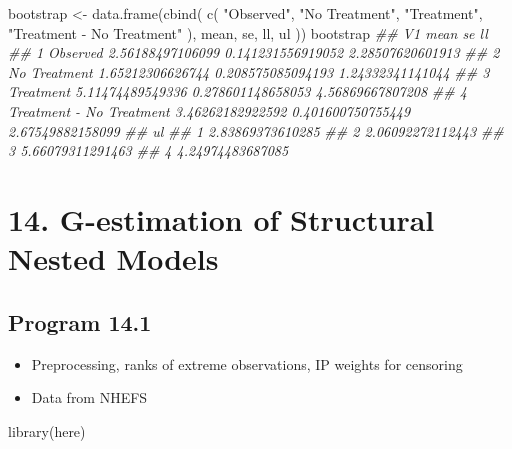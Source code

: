 \documentclass[
  10pt,
  a4paper,
]{book}
\newenvironment{Shaded}{\begin{snugshade}}{\end{snugshade}}
\newcommand{\DocumentationTok}[1]{\textcolor[rgb]{0.37,0.37,0.37}{\textit{#1}}}
\newcommand{\FunctionTok}[1]{\textcolor[rgb]{0.28,0.35,0.67}{#1}}
\newcommand{\NormalTok}[1]{\textcolor[rgb]{0.00,0.46,0.62}{#1}}
\newcommand{\OtherTok}[1]{\textcolor[rgb]{0.00,0.46,0.62}{#1}}
\newcommand{\StringTok}[1]{\textcolor[rgb]{0.13,0.47,0.30}{#1}}
\providecommand{\tightlist}{%
  \setlength{\itemsep}{0pt}\setlength{\parskip}{0pt}}
\begin{document}
\begin{Shaded}
\begin{Highlighting}[]
\NormalTok{bootstrap }\OtherTok{\textless{}{-}}
  \FunctionTok{data.frame}\NormalTok{(}\FunctionTok{cbind}\NormalTok{(}
    \FunctionTok{c}\NormalTok{(}
      \StringTok{"Observed"}\NormalTok{,}
      \StringTok{"No Treatment"}\NormalTok{,}
      \StringTok{"Treatment"}\NormalTok{,}
      \StringTok{"Treatment {-} No Treatment"}
\NormalTok{    ),}
\NormalTok{    mean,}
\NormalTok{    se,}
\NormalTok{    ll,}
\NormalTok{    ul}
\NormalTok{  ))}
\NormalTok{bootstrap}
\DocumentationTok{\#\#                         V1             mean                se               ll}
\DocumentationTok{\#\# 1                 Observed 2.56188497106099 0.141231556919052 2.28507620601913}
\DocumentationTok{\#\# 2             No Treatment 1.65212306626744 0.208575085094193 1.24332341141044}
\DocumentationTok{\#\# 3                Treatment 5.11474489549336 0.278601148658053 4.56869667807208}
\DocumentationTok{\#\# 4 Treatment {-} No Treatment 3.46262182922592 0.401600750755449 2.67549882158099}
\DocumentationTok{\#\#                 ul}
\DocumentationTok{\#\# 1 2.83869373610285}
\DocumentationTok{\#\# 2 2.06092272112443}
\DocumentationTok{\#\# 3 5.66079311291463}
\DocumentationTok{\#\# 4 4.24974483687085}
\end{Highlighting}
\end{Shaded}

\chapter*{14. G-estimation of Structural Nested Models}\label{g-estimation-of-structural-nested-models}

\section{Program 14.1}\label{program-14.1}

\begin{itemize}
\tightlist
\item
  Preprocessing, ranks of extreme observations, IP weights for censoring
\item
  Data from NHEFS
\end{itemize}

\begin{Shaded}
\begin{Highlighting}[]
\FunctionTok{library}\NormalTok{(here)}
\end{Highlighting}
\end{Shaded}
\end{document}
